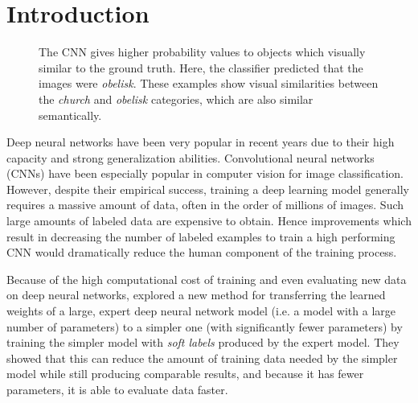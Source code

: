 \section{Introduction}


\begin{figure}[ht!]
  \centering



  \caption{
    The CNN gives higher probability values to objects which visually similar to
    the ground truth. Here, the classifier predicted that the images were
    \emph{obelisk}. These examples show visual similarities between the
    \emph{church} and \emph{obelisk} categories, which are also similar
    semantically.
  }
  \label{fig:qualitative_results}
\end{figure}


Deep neural networks have been very popular in recent years due to their high
capacity and strong generalization abilities.  Convolutional neural networks
(CNNs) have been especially popular in computer vision for image classification.
However, despite their empirical success, training a deep learning model
generally requires a massive amount of data, often in the order of millions of
images. Such large amounts of labeled data are expensive to obtain. Hence 
improvements which result in decreasing the number of labeled examples to train
a high performing CNN would dramatically reduce the human component of the
training process.

Because of the high computational cost of training and even evaluating new data
on deep neural networks, \cite{hinton2015distilling} explored a new method
for transferring the learned weights of a large, expert deep neural network model
(i.e. a model with a large number of parameters) to a simpler one (with
significantly fewer parameters) by training the simpler model with \emph{soft
labels} produced by the expert model. They showed that this can reduce the
amount of training data needed by the simpler model while still producing
comparable results, and because it has fewer parameters, it is able to evaluate
data faster.

